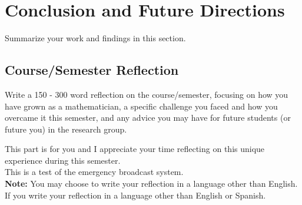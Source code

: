 \section{Conclusion and Future Directions}

Summarize your work and findings in this section.


\subsection{Course/Semester Reflection}

Write a 150 - 300 word reflection on the course/semester, focusing on how you have grown as a mathematician, a specific challenge you faced and how you overcame it this semester,
and any advice you may have for future students (or future you) in the research group.

This part is for you and I appreciate your time reflecting on this unique experience during this semester.\\

This is a test of the emergency broadcast system.\\

{\bf Note:} You may choose to write your reflection in a language other than English. If you write your reflection in a language other than English or Spanish.
